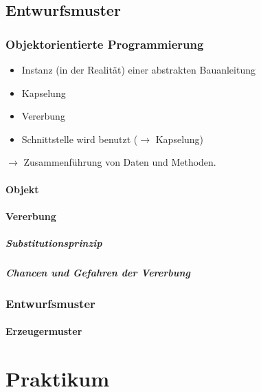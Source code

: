 \documentclass{scrreprt}
\begin{document}
\chapter{Entwurfsmuster}
\section{Objektorientierte Programmierung}
\begin{itemize}
\item Instanz (in der Realität) einer abstrakten Bauanleitung
\item Kapselung
\item Vererbung
\item Schnittstelle wird benutzt ($\to$ Kapselung)
\end{itemize}
$\to$ Zusammenführung von Daten und Methoden.
\subsection{Objekt}
\subsection{Vererbung}
\subsubsection{Substitutionsprinzip}
\subsubsection{Chancen und Gefahren der Vererbung}

\section{Entwurfsmuster}
\subsection{Erzeugermuster}


\part{Praktikum}
\setcounter{chapter}{0}

\end{document}
